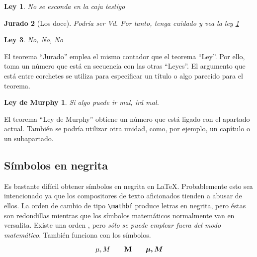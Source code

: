 \begin{example}
\newtheorem{ley}{Ley}
\newtheorem{jurado}[ley]{Jurado}
\begin{ley} \label{law:box}
No se esconda en la caja testigo
\end{ley}
\begin{jurado}[Los doce]
Podría ser Vd. Por tanto, tenga
cuidado y vea la ley
\ref{law:box}\end{jurado}
\begin{ley}No, No, No\end{ley}
\end{example}

El teorema ``Jurado'' emplea el mismo contador que el teorema ``Ley''.
Por  ello,  toma  un  número  que está  en  secuencia  con  las  otras
``Leyes''.  El argumento  que  está entre  corchetes  se utiliza  para
especificar un título o algo parecido para el teorema.

\begin{example}
\newtheorem{mur}{Ley de Murphy}[section]
\begin{mur} Si algo puede ir mal,
irá mal.
\end{mur}
\end{example}

El teorema ``Ley de Murphy'' obtiene  un número que está ligado con el
apartado actual.  También se  podría utilizar  otra unidad,  como, por
ejemplo, un capítulo o un subapartado.

\subsection{Símbolos en negrita}

Es  bastante   difícil  obtener  símbolos  en   negrita  en  \LaTeX\@.
Probablemente esto sea  intencionado ya que los  compositores de texto
aficionados tienden  a abusar  de ellos.  La orden  de cambio  de tipo
\verb|\mathbf| produce  letras en negrita, pero  éstas son redondillas
mientras que  los símbolos  matemáticos normalmente van  en versalita.
Existe una orden , pero \emph{sólo se puede emplear fuera
del modo matemático}. También funciona con los símbolos.

\begin{example}
\begin{displaymath}
\mu, M \qquad \mathbf{M} \qquad
\mbox{\boldmath $\mu, M$}
\end{displaymath}
\end{example}

